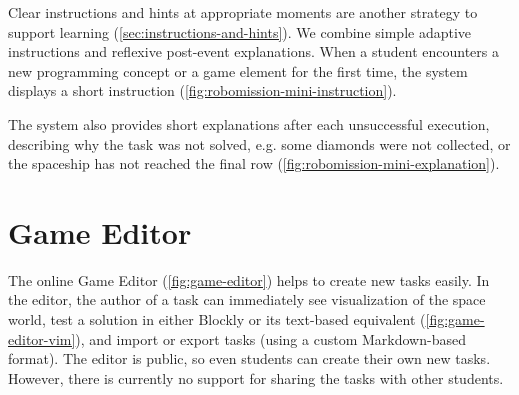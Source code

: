 Clear instructions and hints at appropriate moments
are another strategy to support learning
(\cref{sec:instructions-and-hints}).
We combine simple adaptive instructions and reflexive post-event explanations.
When a student encounters a new programming concept or a game element
for the first time, the system displays a short instruction
(\cref{fig:robomission-mini-instruction}).


The system also provides short explanations after each unsuccessful execution,
describing why the task was not solved,
e.g. some diamonds were not collected,
or the spaceship has not reached the final row
(\cref{fig:robomission-mini-explanation}).


\section{Game Editor}  %
\label{sec:robomission.task-editor}

The online Game Editor (\cref{fig:game-editor})
helps to create new tasks easily.
In the editor, the author of a task can immediately see visualization of the
space world,
test a solution in either Blockly or its text-based equivalent %
(\cref{fig:game-editor-vim}),
and import or export tasks (using a custom Markdown-based format).
The editor is public, so even students can create their own new tasks.
However, there is currently no support for sharing the tasks with other students.



